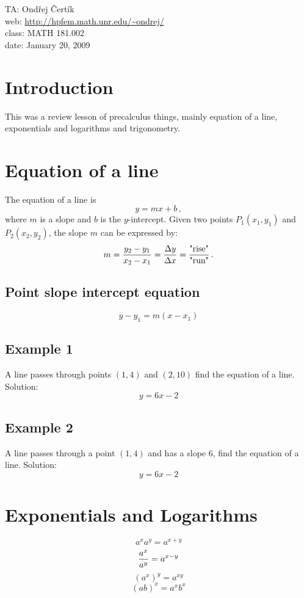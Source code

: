 \documentclass[10pt]{article}
\begin{document}
\noindent TA: Ondřej Čertík\\
web: \url{http://hpfem.math.unr.edu/~ondrej/}\\
class: MATH 181.002\\
date: January 20, 2009

\section{Introduction}

This was a review lesson of precalculus things, mainly equation of a line,
exponentials and logarithms and trigonometry.

\section{Equation of a line}

The equation of a line is
$$y=mx+b\,,$$
where $m$ is a slope and $b$ is the $y$-intercept. Given two points $P_1(x_1,
y_1)$ and $P_2(x_2, y_2)$, the slope $m$ can be expressed by:
$$m={y_2-y_1\over x_2-x_1}={\Delta y\over\Delta x} = {\mbox{"rise"}\over\mbox{"run"}}\,.$$

\subsection{Point slope intercept equation}

$$y-y_1 = m(x-x_1)$$

\subsection{Example 1}

A line passes through points $(1, 4)$ and $(2, 10)$ find the equation of a
line. Solution:
$$y=6x-2$$

\subsection{Example 2}

A line passes through a point $(1, 4)$ and has a slope 6, find the equation of a
line. Solution:
$$y=6x-2$$

\section{Exponentials and Logarithms}

$$a^xa^y = a^{x+y}$$
$${a^x\over a^y} = a^{x-y}$$
$$(a^x)^y = a^{xy}$$
$$(ab)^x = a^xb^x$$
\end{document}
